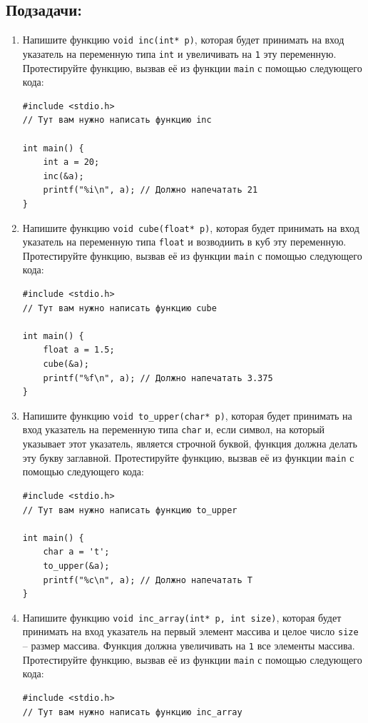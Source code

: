 \documentclass{article}
\begin{document}
\subsection*{Подзадачи:}
\begin{enumerate}
\item Напишите функцию \texttt{void inc(int* p)}, которая будет принимать на вход указатель на переменную типа \texttt{int} и увеличивать на \texttt{1} эту переменную. Протестируйте функцию, вызвав её из функции \texttt{main} с помощью следующего кода:
\begin{lstlisting}
#include <stdio.h>
// Тут вам нужно написать функцию inc

int main() {
    int a = 20;
    inc(&a);
    printf("%i\n", a); // Должно напечатать 21
}
\end{lstlisting}
\item Напишите функцию \texttt{void cube(float* p)}, которая будет принимать на вход указатель на переменную типа \texttt{float} и возводиить в куб эту переменную. Протестируйте функцию, вызвав её из функции \texttt{main} с помощью следующего кода: 
\begin{lstlisting}
#include <stdio.h>
// Тут вам нужно написать функцию cube

int main() {
    float a = 1.5;
    cube(&a);
    printf("%f\n", a); // Должно напечатать 3.375
}
\end{lstlisting}

\item Напишите функцию \texttt{void to\_upper(char* p)}, которая будет принимать на вход указатель на переменную типа \texttt{char} и, если символ, на который указывает этот указатель, является строчной буквой, функция должна делать эту букву заглавной. Протестируйте функцию, вызвав её из функции \texttt{main} с помощью следующего кода: 
\begin{lstlisting}
#include <stdio.h>
// Тут вам нужно написать функцию to_upper

int main() {
    char a = 't';
    to_upper(&a);
    printf("%c\n", a); // Должно напечатать T
}
\end{lstlisting}

\item Напишите функцию \texttt{void inc\_array(int* p, int size)}, которая будет принимать на вход указатель на первый элемент массива и целое число \texttt{size} -- размер массива. Функция должна увеличивать на \texttt{1} все элементы массива. Протестируйте функцию, вызвав её из функции \texttt{main} с помощью следующего кода:
\begin{lstlisting}
#include <stdio.h>
// Тут вам нужно написать функцию inc_array


\end{lstlisting}
\end{enumerate}
\end{document}
